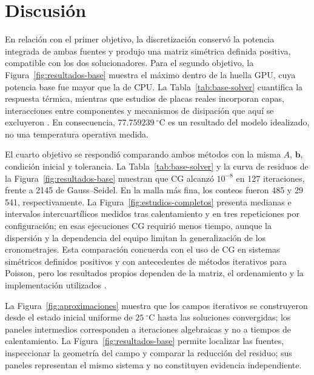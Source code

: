\section{Discusi\'on}

En relaci\'on con el primer objetivo, la discretizaci\'on conserv\'o la potencia integrada de ambas fuentes y produjo una matriz sim\'etrica definida positiva, compatible con los dos solucionadores. Para el segundo objetivo, la Figura~\ref{fig:resultados-base} muestra el m\'aximo dentro de la huella GPU, cuya potencia base fue mayor que la de CPU. La Tabla~\ref{tab:base-solver} cuantifica la respuesta t\'ermica, mientras que estudios de placas reales incorporan capas, interacciones entre componentes y mecanismos de disipaci\'on que aqu\'i se excluyeron \citep{harvest2007devices,moniervinard2015pcb,zhang2024pcb,skadron2003hotspot}. En consecuencia, $77.759239\ ^\circ$C es un resultado del modelo idealizado, no una temperatura operativa medida.

El cuarto objetivo se respondi\'o comparando ambos m\'etodos con la misma $A$, $\mathbf{b}$, condici\'on inicial y tolerancia. La Tabla~\ref{tab:base-solver} y la curva de residuos de la Figura~\ref{fig:resultados-base} muestran que CG alcanz\'o $10^{-8}$ en 127 iteraciones, frente a 2145 de Gauss--Seidel. En la malla m\'as fina, los conteos fueron 485 y 29\,541, respectivamente. La Figura~\ref{fig:estudios-completos} presenta medianas e intervalos intercuart\'ilicos medidos tras calentamiento y en tres repeticiones por configuraci\'on; en esas ejecuciones CG requiri\'o menos tiempo, aunque la dispersi\'on y la dependencia del equipo limitan la generalizaci\'on de los cronometrajes. Esta comparaci\'on concuerda con el uso de CG en sistemas sim\'etricos definidos positivos y con antecedentes de m\'etodos iterativos para Poisson, pero los resultados propios dependen de la matriz, el ordenamiento y la implementaci\'on utilizados \citep{zhang2001,xu2011poisson,oladejo2007tool}.

La Figura~\ref{fig:aproximaciones} muestra que los campos iterativos se construyeron desde el estado inicial uniforme de $25\ ^\circ$C hasta las soluciones convergidas; los paneles intermedios corresponden a iteraciones algebraicas y no a tiempos de calentamiento. La Figura~\ref{fig:resultados-base} permite localizar las fuentes, inspeccionar la geometr\'ia del campo y comparar la reducci\'on del residuo; sus paneles representan el mismo sistema y no constituyen evidencia independiente.

